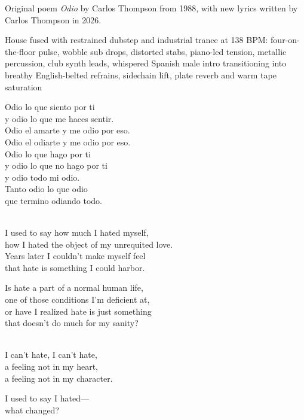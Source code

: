 
\label{sec:used-to-say}
\begin{notes}
Original poem \emph{Odio} by Carlos Thompson from 1988, with new lyrics written by Carlos Thompson in 2026.
\end{notes}
\begin{style}
House fused with restrained dubstep and industrial trance at 138 BPM: four-on-the-floor pulse, wobble sub drops, distorted stabs, piano-led tension, metallic percussion, club synth leads, whispered Spanish male intro transitioning into breathy English-belted refrains, sidechain lift, plate reverb and warm tape saturation
\end{style}
\begin{lyrics}
Odio lo que siento por ti\\
y odio lo que me haces sentir.\\
Odio el amarte y me odio por eso.\\
Odio el odiarte y me odio por eso.\\
Odio lo que hago por ti\\
y odio lo que no hago por ti\\
y odio todo mi odio.\\
Tanto odio lo que odio\\
que termino odiando todo.

\\
I used to say how much I hated myself,\\
how I hated the object of my unrequited love.\\
Years later I couldn’t make myself feel\\
that hate is something I could harbor.

Is hate a part of a normal human life,\\
one of those conditions I’m deficient at,\\
or have I realized hate is just something\\
that doesn’t do much for my sanity?

\\
I can’t hate, I can’t hate,\\
a feeling not in my heart,\\
a feeling not in my character.

I used to say I hated—\\
what changed?


\end{lyrics}
